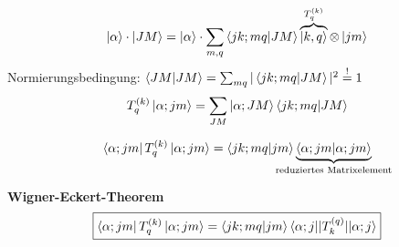 




{\Huge

\begin{align*}
\ket{\alpha}\cdot\ket{JM} =  \ket{\alpha}\cdot\sum_{m,q} \braket{jk;mq}{JM} \overbr{\ket{k,q}}^{ T^{(k)}_q }\otimes\ket{jm}\notag 
\end{align*}
Normierungsbedingung: \(\braket{JM}{JM} = \sum_{mq}|\braket{jk;mq}{JM} |^2 \stackrel{!}= 1\)
\begin{align*}
   T^{(k)}_q  \ket{\alpha;jm} = \sum_{JM}\ket{\alpha; JM} \braket{jk;mq}{JM}
\end{align*}

\begin{align*}
   \bra{\alpha;jm} T^{(k)}_q  \ket{\alpha;jm} =   \braket{jk;mq}{jm} \underbr{\braket{\alpha;jm}{\alpha; jm}}_{\text{reduziertes Matrixelement}}
\end{align*}

\textbf{Wigner-Eckert-Theorem}
\begin{align*}
  \boxed{\bra{\alpha;jm} T^{(k)}_q  \ket{\alpha;jm} =  \braket{jk;mq}{jm} \langle \alpha;j || T^{(q)}_k || \alpha; j \rangle }
\end{align*}

}%

